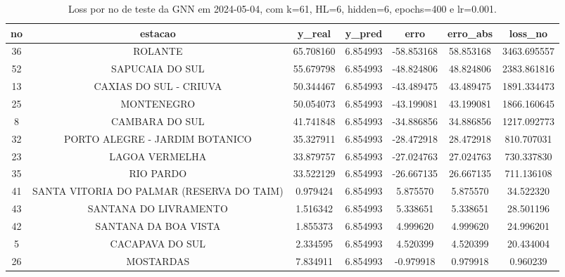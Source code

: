 \begin{table}[h]
\centering
\caption{Loss por no de teste da GNN em 2024-05-04, com k=61, HL=6, hidden=6, epochs=400 e lr=0.001.}
\label{tab:gnn_loss_k61_hl6_h6_e400_d20240504}
\begin{tabular}{ccccccc}
\toprule
no & estacao & y\_real & y\_pred & erro & erro\_abs & loss\_no \\
\midrule
36 & ROLANTE & 65.708160 & 6.854993 & -58.853168 & 58.853168 & 3463.695557 \\
52 & SAPUCAIA DO SUL & 55.679798 & 6.854993 & -48.824806 & 48.824806 & 2383.861816 \\
13 & CAXIAS DO SUL - CRIUVA & 50.344467 & 6.854993 & -43.489475 & 43.489475 & 1891.334473 \\
25 & MONTENEGRO & 50.054073 & 6.854993 & -43.199081 & 43.199081 & 1866.160645 \\
8 & CAMBARA DO SUL & 41.741848 & 6.854993 & -34.886856 & 34.886856 & 1217.092773 \\
32 & PORTO ALEGRE - JARDIM BOTANICO & 35.327911 & 6.854993 & -28.472918 & 28.472918 & 810.707031 \\
23 & LAGOA VERMELHA & 33.879757 & 6.854993 & -27.024763 & 27.024763 & 730.337830 \\
35 & RIO PARDO & 33.522129 & 6.854993 & -26.667135 & 26.667135 & 711.136108 \\
41 & SANTA VITORIA DO PALMAR (RESERVA DO TAIM) & 0.979424 & 6.854993 & 5.875570 & 5.875570 & 34.522320 \\
43 & SANTANA DO LIVRAMENTO & 1.516342 & 6.854993 & 5.338651 & 5.338651 & 28.501196 \\
42 & SANTANA DA BOA VISTA & 1.855373 & 6.854993 & 4.999620 & 4.999620 & 24.996201 \\
5 & CACAPAVA DO SUL & 2.334595 & 6.854993 & 4.520399 & 4.520399 & 20.434004 \\
26 & MOSTARDAS & 7.834911 & 6.854993 & -0.979918 & 0.979918 & 0.960239 \\
\bottomrule
\end{tabular}
\end{table}
